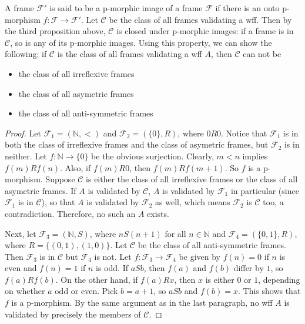 \documentclass[12pt]{article}
\begin{document}
A frame $\mathcal{F}'$ is said to be a p-morphic image of a frame $\mathcal{F}$ if there is an onto p-morphism $f: \mathcal{F} \to \mathcal{F}'$.  Let $\mathcal{C}$ be the class of all frames validating a wff.  Then by the third proposition above, $\mathcal{C}$ is closed under p-morphic images: if a frame is in $\mathcal{C}$, so is any of its p-morphic images.  Using this property, we can show the following: if $\mathcal{C}$ is the class of all frames validating a wff $A$, then $\mathcal{C}$ can not be
\begin{itemize}
\item the class of all irreflexive frames
\item the class of all asymetric frames
\item the class of all anti-symmetric frames
\end{itemize}
\begin{proof}  Let $\mathcal{F}_1 = (\mathbb{N},<)$ and $\mathcal{F}_2 = (\lbrace 0 \rbrace, R)$, where $0R0$.  Notice that $\mathcal{F}_1$ is in both the class of irreflexive frames and the class of asymetric frames, but $\mathcal{F}_2$ is in neither.  Let $f: \mathbb{N}\to \lbrace 0\rbrace$ be the obvious surjection.  Clearly, $m<n$ implies $f(m)Rf(n)$.  Also, if $f(m)R0$, then $f(m)Rf(m+1)$.  So $f$ is a p-morphism.  Suppose $\mathcal{C}$ is either the class of all irreflexive frames or the class of all asymetric frames.  If $A$ is validated by $\mathcal{C}$, $A$ is validated by $\mathcal{F}_1$ in particular (since $\mathcal{F}_1$ is in $\mathcal{C}$), so that $A$ is validated by $\mathcal{F}_2$ as well, which means $\mathcal{F}_2$ is $\mathcal{C}$ too, a contradiction.  Therefore, no such an $A$ exists.

Next, let $\mathcal{F}_3 = (\mathbb{N}, S)$, where $n S (n+1)$ for all $n\in \mathbb{N}$ and  $\mathcal{F}_4 = (\lbrace 0,1\rbrace, R)$, where $R=\lbrace (0,1),(1,0)\rbrace$.  Let $\mathcal{C}$ be the class of all anti-symmetric frames.  Then $\mathcal{F}_3$ is in $\mathcal{C}$ but $\mathcal{F}_4$ is not.  Let $f:\mathcal{F}_3\to \mathcal{F}_4$ be given by $f(n)=0$ if $n$ is even and $f(n)=1$ if $n$ is odd.  If $a S b$, then $f(a)$ and $f(b)$ differ by $1$, so $f(a) R f(b)$.  On the other hand, if $f(a) R x$, then $x$ is either $0$ or $1$, depending on whether $a$ odd or even.  Pick $b=a+1$, so $a S b$ and $f(b)=x$.  This shows that $f$ is a p-morphism.  By the same argument as in the last paragraph, no wff $A$ is validated by precisely the members of $\mathcal{C}$.
\end{proof}

\end{document}
